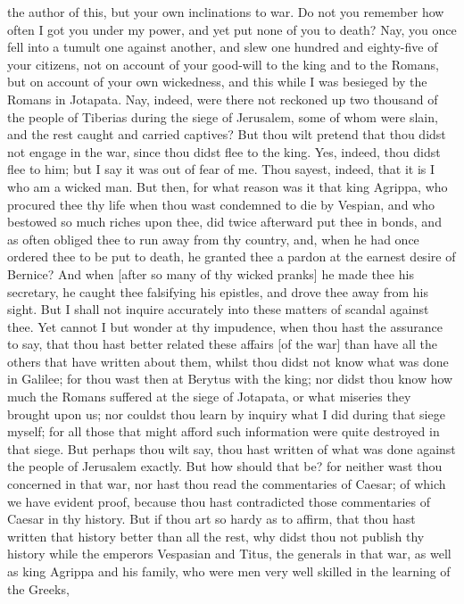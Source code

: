 the author of this, but your own inclinations to war. Do not you remember
how often I got you under my power, and yet put none of you to death? Nay,
you once fell into a tumult one against another, and slew one hundred and
eighty-five of your citizens, not on account of your good-will to the king
and to the Romans, but on account of your own wickedness, and this while I
was besieged by the Romans in Jotapata. Nay, indeed, were there not
reckoned up two thousand of the people of Tiberias during the siege of
Jerusalem, some of whom were slain, and the rest caught and carried
captives? But thou wilt pretend that thou didst not engage in the war,
since thou didst flee to the king. Yes, indeed, thou didst flee to him;
but I say it was out of fear of me. Thou sayest, indeed, that it is I who
am a wicked man. But then, for what reason was it that king Agrippa, who
procured thee thy life when thou wast condemned to die by Vespian, and who
bestowed so much riches upon thee, did twice afterward put thee in bonds,
and as often obliged thee to run away from thy country, and, when he had
once ordered thee to be put to death, he granted thee a pardon at the
earnest desire of Bernice? And when [after so many of thy wicked pranks]
he made thee his secretary, he caught thee falsifying his epistles, and
drove thee away from his sight. But I shall not inquire accurately into
these matters of scandal against thee. Yet cannot I but wonder at thy
impudence, when thou hast the assurance to say, that thou hast better
related these affairs [of the war] than have all the others that have
written about them, whilst thou didst not know what was done in Galilee;
for thou wast then at Berytus with the king; nor didst thou know how much
the Romans suffered at the siege of Jotapata, or what miseries they
brought upon us; nor couldst thou learn by inquiry what I did during that
siege myself; for all those that might afford such information were quite
destroyed in that siege. But perhaps thou wilt say, thou hast written of
what was done against the people of Jerusalem exactly. But how should that
be? for neither wast thou concerned in that war, nor hast thou read the
commentaries of Caesar; of which we have evident proof, because thou hast
contradicted those commentaries of Caesar in thy history. But if thou art
so hardy as to affirm, that thou hast written that history better than all
the rest, why didst thou not publish thy history while the emperors
Vespasian and Titus, the generals in that war, as well as king Agrippa and
his family, who were men very well skilled in the learning of the Greeks,
